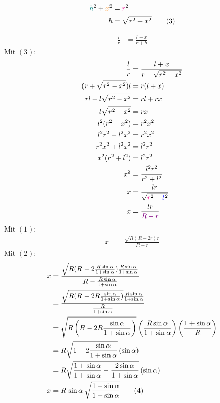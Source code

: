 \begin{align*}
	\textcolor{teal}{h}^2 + \textcolor{orange}{x}^2 &= \textcolor{magenta}{r}^2 \\
	h &= \sqrt{r^2-x^2} \tag{3}
\end{align*}

\begin{samepage}
	\begin{align*}
		\frac{l}{r} &= \frac{l+x}{r+h}
	\end{align*}
	Mit $(3)$:
	\begin{align*}
		\frac{l}{r} &= \frac{l+x}{r+\sqrt{r^2-x^2}} \\
		(r+\sqrt{r^2-x^2})l &= r(l+x) \\
		rl + l\sqrt{r^2-x^2} &= rl+rx \\
		l\sqrt{r^2-x^2} &= rx \\
		l^2(r^2-x^2) &= r^2 x^2 \\
		l^2 r^2 - l^2 x^2 &= r^2 x^2 \\
		r^2 x^2 + l^2 x^2 &= l^2 r^2 \\
		x^2 (r^2+l^2) &= l^2 r^2 \\
		x^2 &= \frac{l^2 r^2}{r^2 + l^2} \\
		x &= \frac{lr}{\sqrt{\textcolor{magenta}{r}^2+\textcolor{blue}{l}^2}} \\
		x &= \frac{lr}{\textcolor{violet}{R-r}}
	\end{align*}
	Mit $(1)$:
	\begin{align*}
		x &= \frac{\sqrt{R(R-2r)}r}{R-r}
	\end{align*}
	Mit $(2)$:
	\begin{align*}
		x &= \frac{\sqrt{R(R-2\frac{R\sin\alpha}{1+\sin\alpha})}\frac{R\sin\alpha}{1+\sin\alpha}}{R-\frac{R\sin\alpha}{1+\sin\alpha}} \\
		&= \frac{\sqrt{R(R-2R\frac{\sin\alpha}{1+\sin\alpha})}\frac{R\sin\alpha}{1+\sin\alpha}}{\frac{R}{1+\sin\alpha}} \\
		&= \sqrt{R\left(R-2R\frac{\sin\alpha}{1+\sin\alpha}\right)}\left(\frac{R\sin\alpha}{1+\sin\alpha}\right)\left(\frac{1+\sin\alpha}{R}\right) \\
		&= R\sqrt{1-2\frac{\sin\alpha}{1+\sin\alpha}} \, (\sin\alpha) \\
		&= R\sqrt{\frac{1+\sin\alpha}{1+\sin\alpha}-\frac{2\sin\alpha}{1+\sin\alpha}} \, (\sin\alpha) \\
		x &= R \, \sin\alpha \, \sqrt{\frac{1-\sin\alpha}{1+\sin\alpha}} \tag{4}
	\end{align*}
\end{samepage}
\goodbreak
